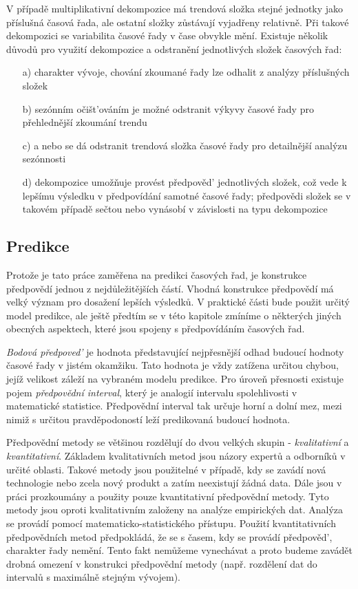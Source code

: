 \documentclass[a4paper,12pt,twoside]{scrreprt}
\begin{document}
V případě multiplikativní dekompozice má trendová složka stejné jednotky jako příslušná časová řada, ale ostatní složky zůstávají vyjadřeny relativně. Při takové dekompozici se variabilita časové řady v čase obvykle mění. Existuje několik důvodů pro využití dekompozice a odstranění jednotlivých složek časových řad:

\begin{itemize}
\item[a)] charakter vývoje, chování zkoumané řady lze odhalit z analýzy příslušných složek
\item[b)] sezónním očišt'ováním je možné odstranit výkyvy časové řady pro přehlednější zkoumání trendu
\item[c)] a nebo se dá odstranit trendová složka časové řady pro detailnější analýzu sezónnosti
\item[d)] dekompozice umožňuje provést předpověd' jednotlivých složek, což vede k lepšímu výsledku v předpovídání samotné časové řady; předpovědi složek se v takovém případě sečtou nebo vynásobí v závislosti na typu dekompozice
\end{itemize}

\subsection{Predikce}

Protože je tato práce zaměřena na predikci časových řad, je konstrukce předpovědí jednou z nejdůležitějších částí. Vhodná konstrukce předpovědí má velký význam pro dosažení lepších výsledků. V praktické části bude použit určitý model predikce, ale ještě předtím se v této kapitole zmíníme o některých jiných obecných aspektech, které jsou spojeny s předpovídáním časových řad. 

\textit{Bodová předpoved'} je hodnota představující nejpřesnější odhad budoucí hodnoty časové řady v jistém okamžiku. Tato hodnota je vždy zatížena určitou chybou, jejíž velikost záleží na vybraném modelu predikce. Pro úroveň přesnosti existuje pojem \textit{předpovědní interval}, který je analogií intervalu spolehlivosti v matematické statistice. Předpovědní interval tak určuje horní a dolní mez, mezi nimiž s určitou pravděpodoností leží predikovaná budoucí hodnota.  

Předpovědní metody se většinou rozdělují do dvou velkých skupin - \textit{kvalitativní} a \textit{kvantitativní}. Základem kvalitativních metod jsou názory expertů a odborníků v určité oblasti. Takové metody jsou použitelné v případě, kdy se zavádí nová technologie nebo zcela nový produkt a zatím neexistují žádná data. Dále jsou v práci prozkoumány a použity pouze kvantitativní předpovědní metody. Tyto metody jsou oproti kvalitativním založeny na analýze empirických dat. Analýza se provádí pomocí matematicko-statistického přístupu. Použití kvantitativních předpovědních metod předpokládá, že se s časem, kdy se provádí předpověd', charakter řady nemění. Tento fakt nemůžeme vynechávat a proto budeme zavádět drobná omezení v konstrukci předpovědní metody (např. rozdělení dat do intervalů s maximálně stejným vývojem). \cite{cipra}
\end{document}
